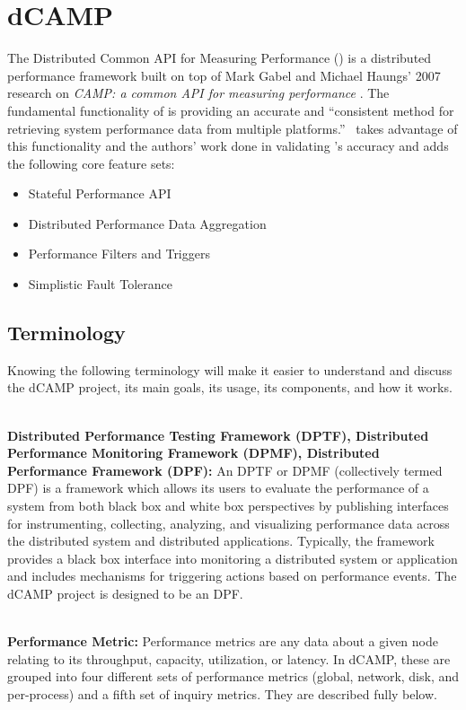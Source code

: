 \chapter{dCAMP}
\label{dcamp}

The Distributed Common API for Measuring Performance (\dcamp) is a distributed performance framework built on top of Mark Gabel and Michael Haungs' 2007 research on \emph{CAMP: a common API for measuring performance} \cite{gabel2007}. The fundamental functionality of \camp is providing an accurate and ``consistent method for retrieving system performance data from multiple platforms.'' \dcamp\ takes advantage of this functionality and the authors' work done in validating \camp's accuracy and adds the following core feature sets:
\begin{itemize}
\item Stateful Performance API
\item Distributed Performance Data Aggregation
\item Performance Filters and Triggers
\item Simplistic Fault Tolerance
\end{itemize}

\section{Terminology}
Knowing the following terminology will make it easier to understand and discuss the dCAMP project, its main goals, its usage, its components, and how it works. 

~\\ \textbf{Distributed Performance Testing Framework (DPTF), Distributed Performance Monitoring Framework (DPMF), Distributed Performance Framework (DPF):} An DPTF or DPMF (collectively termed DPF) is a framework which allows its users to evaluate the performance of a system from both black box and white box perspectives by publishing interfaces for instrumenting, collecting, analyzing, and visualizing performance data across the distributed system and distributed applications. Typically, the framework provides a black box interface into monitoring a distributed system or application and includes mechanisms for triggering actions based on performance events. The dCAMP project is designed to be an DPF. 

~\\ \textbf{Performance Metric:} Performance metrics are any data about a given node relating to its throughput, capacity, utilization, or latency. In dCAMP, these are grouped into four different sets of performance metrics (global, network, disk, and per-process) and a fifth set of inquiry metrics. They are described fully below. 

